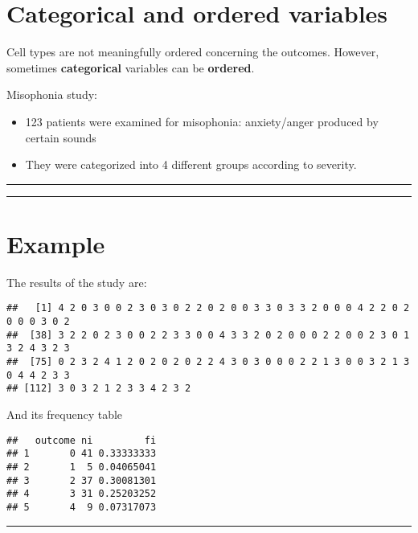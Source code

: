 \documentclass[
]{book}
\begin{document}
\hypertarget{categorical-and-ordered-variables}{%
\section{Categorical and ordered variables}\label{categorical-and-ordered-variables}}

Cell types are not meaningfully ordered concerning the outcomes. However, sometimes \textbf{categorical} variables can be \textbf{ordered}.

Misophonia study:

\begin{itemize}
\item
  123 patients were examined for misophonia: anxiety/anger produced by certain sounds
\item
  They were categorized into 4 different groups according to severity.
\end{itemize}

\begin{center}\rule{0.5\linewidth}{0.5pt}\end{center}

\begin{center}\rule{0.5\linewidth}{0.5pt}\end{center}

\hypertarget{example-2}{%
\section{Example}\label{example-2}}

The results of the study are:

\begin{verbatim}
##   [1] 4 2 0 3 0 0 2 3 0 3 0 2 2 0 2 0 0 3 3 0 3 3 2 0 0 0 4 2 2 0 2 0 0 0 3 0 2
##  [38] 3 2 2 0 2 3 0 0 2 2 3 3 0 0 4 3 3 2 0 2 0 0 0 2 2 0 0 2 3 0 1 3 2 4 3 2 3
##  [75] 0 2 3 2 4 1 2 0 2 0 2 0 2 2 4 3 0 3 0 0 0 2 2 1 3 0 0 3 2 1 3 0 4 4 2 3 3
## [112] 3 0 3 2 1 2 3 3 4 2 3 2
\end{verbatim}

And its frequency table

\begin{verbatim}
##   outcome ni         fi
## 1       0 41 0.33333333
## 2       1  5 0.04065041
## 3       2 37 0.30081301
## 4       3 31 0.25203252
## 5       4  9 0.07317073
\end{verbatim}

\begin{center}\rule{0.5\linewidth}{0.5pt}\end{center}
\end{document}
